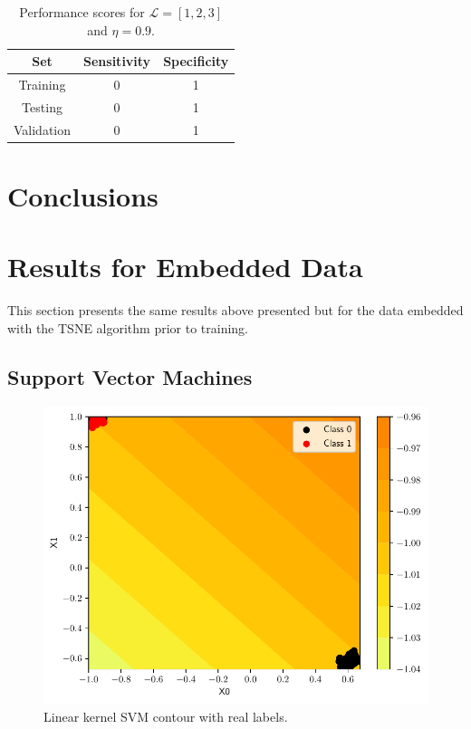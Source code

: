 \documentclass[conference]{IEEEtran}
\theoremstyle{definition}
\theoremstyle{remark}
\theoremstyle{remark}
\begin{document}
\begin{table}
\centering
\caption{Performance scores for $\mathcal{L}=[1,2,3]$ and $\eta=0.9$.}
\label{tab:L123}
\begin{tabular}{ccc}
\hline
\textbf{Set} & \textbf{Sensitivity} & \textbf{Specificity} \\ \hline
Training & 0 & 1 \\
Testing & 0 & 1 \\
Validation & 0 & 1 \\ \hline
\end{tabular}
\end{table}

\section{Conclusions}\label{sec:conc}

\printbibliography

\appendices

\section{Results for Embedded Data}
This section presents the same results above presented but for the data
embedded with the TSNE algorithm prior to training.
\subsection{Support Vector Machines}
\begin{figure}
  \includegraphics[width=\columnwidth]{figs/svm-emb-linear-contour-0-1.pdf}
  \caption{Linear kernel SVM contour with real labels.}
\end{figure}
\end{document}
